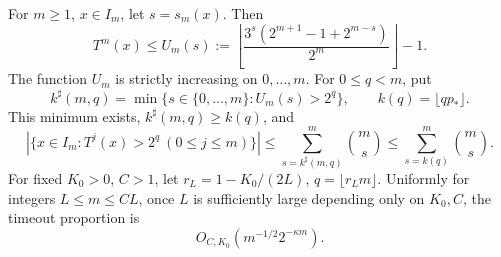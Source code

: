 \begin{proposition}
\label{prop:Shaik-timeout-tail}
For \(m\ge1\), \(x\in I_m\), let \(s=s_m(x)\). Then
\begin{equation}\label{eq:Shaik-integer-affine}
 T^m(x)\le U_m(s):=
 \left\lfloor\frac{3^s(2^{m+1}-1+2^{m-s})}{2^m}\right\rfloor-1.
\end{equation}
The function \(U_m\) is strictly increasing on \(0,\ldots,m\).
For \(0\le q<m\), put
\[
 k^\sharp(m,q)=\min\{s\in\{0,\ldots,m\}:U_m(s)>2^q\},\qquad
 k(q)=\lfloor qp_*\rfloor .
\]
This minimum exists, \(k^\sharp(m,q)\ge k(q)\), and
\begin{equation}\label{eq:Shaik-timeout-finite}
 |\{x\in I_m:T^j(x)>2^q\ (0\le j\le m)\}|
 \le\sum_{s=k^\sharp(m,q)}^m\binom ms
 \le\sum_{s=k(q)}^m\binom ms .
\end{equation}
For fixed \(K_0>0\), \(C>1\), let
\(r_L=1-K_0/(2L)\), \(q=\lfloor r_Lm\rfloor\).
Uniformly for integers \(L\le m\le CL\), once \(L\) is sufficiently
large depending only on \(K_0,C\), the timeout proportion is
\begin{equation}\label{eq:Shaik-timeout-critical}
 O_{C,K_0}(m^{-1/2}2^{-\kappa m}).
\end{equation}
\end{proposition}
